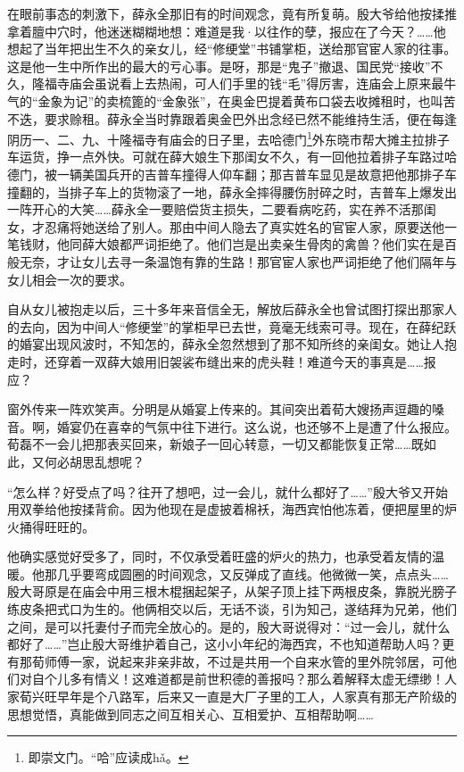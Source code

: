 \par 在眼前事态的刺激下，薛永全那旧有的时间观念，竟有所复萌。殷大爷给他按揉推拿着膻中穴时，他迷迷糊糊地想：难道是我·以往作的孽，报应在了今天？……他想起了当年把出生不久的亲女儿，经“修绠堂”书铺掌柜，送给那官宦人家的往事。这是他一生中所作出的最大的亏心事。是呀，那是“鬼子”撤退、国民党“接收”不久，隆福寺庙会虽说看上去热闹，可人们手里的钱“毛”得厉害，连庙会上原来最牛气的“金象为记”的卖梳篦的“金象张”，在奥金巴提着黄布口袋去收摊租时，也叫苦不迭，要求赊租。薛永全当时靠跟着奥金巴外出念经已然不能维持生活，便在每逢阴历一、二、九、十隆福寺有庙会的日子里，去哈德门\footnote{即崇文门。“哈”应读成hǎ。}外东晓市帮大摊主拉排子车运货，挣一点外快。可就在薛大娘生下那闺女不久，有一回他拉着排子车路过哈德门，被一辆美国兵开的吉普车撞得人仰车翻；那吉普车显见是故意把他那排子车撞翻的，当排子车上的货物滚了一地，薛永全摔得腰伤肘碎之时，吉普车上爆发出一阵开心的大笑……薛永全一要赔偿货主损失，二要看病吃药，实在养不活那闺女，才忍痛将她送给了别人。那由中间人隐去了真实姓名的官宦人家，原要送他一笔钱财，他同薛大娘都严词拒绝了。他们岂是出卖亲生骨肉的禽兽？他们实在是百般无奈，才让女儿去寻一条温饱有靠的生路！那官宦人家也严词拒绝了他们隔年与女儿相会一次的要求。
\par 自从女儿被抱走以后，三十多年来音信全无，解放后薛永全也曾试图打探出那家人的去向，因为中间人“修绠堂”的掌柜早已去世，竟毫无线索可寻。现在，在薛纪跃的婚宴出现风波时，不知怎的，薛永全忽然想到了那不知所终的亲闺女。她让人抱走时，还穿着一双薛大娘用旧袈裟布缝出来的虎头鞋！难道今天的事真是……报应？
\par 窗外传来一阵欢笑声。分明是从婚宴上传来的。其间突出着荀大嫂扬声逗趣的嗓音。啊，婚宴仍在喜幸的气氛中往下进行。这么说，也还够不上是遭了什么报应。荀磊不一会儿把那表买回来，新娘子一回心转意，一切又都能恢复正常……既如此，又何必胡思乱想呢？
\par “怎么样？好受点了吗？往开了想吧，过一会儿，就什么都好了……”殷大爷又开始用双拳给他按揉背俞。因为他现在是虚披着棉袄，海西宾怕他冻着，便把屋里的炉火捅得旺旺的。
\par 他确实感觉好受多了，同时，不仅承受着旺盛的炉火的热力，也承受着友情的温暖。他那几乎要弯成圆圈的时间观念，又反弹成了直线。他微微一笑，点点头……殷大哥原是在庙会中用三根木棍捆起架子，从架子顶上挂下两根皮条，靠脱光膀子练皮条把式口为生的。他俩相交以后，无话不谈，引为知己，遂结拜为兄弟，他们之间，是可以托妻付子而完全放心的。是的，殷大哥说得对：“过一会儿，就什么都好了……”岂止殷大哥维护着自己，这小小年纪的海西宾，不也知道帮助人吗？更有那荀师傅一家，说起来非亲非故，不过是共用一个自来水管的里外院邻居，可他们对自个儿多有情义！这难道都是前世积德的善报吗？那么着解释太虚无缥缈！人家荀兴旺早年是个八路军，后来又一直是大厂子里的工人，人家真有那无产阶级的思想觉悟，真能做到同志之间互相关心、互相爱护、互相帮助啊……
